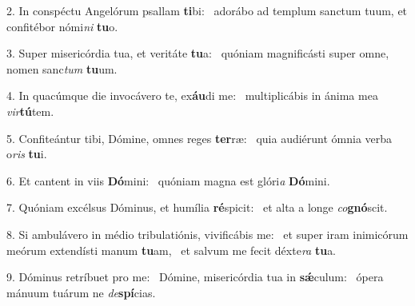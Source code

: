 2. In conspéctu Angelórum psallam \textbf{ti}bi: \ast\  adorábo ad templum sanctum tuum, et confitébor nómi\textit{ni} \textbf{tu}o.\

3. Super misericórdia tua, et veritáte \textbf{tu}a: \ast\  quóniam magnificásti super omne, nomen sanc\textit{tum} \textbf{tu}um.\

4. In quacúmque die invocávero te, ex\textbf{áu}di me: \ast\  multiplicábis in ánima mea \textit{vir}\textbf{tú}tem.\

5. Confiteántur tibi, Dómine, omnes reges \textbf{ter}ræ: \ast\  quia audiérunt ómnia verba o\textit{ris} \textbf{tu}i.\

6. Et cantent in viis \textbf{Dó}mini: \ast\  quóniam magna est glóri\textit{a} \textbf{Dó}mini.\

7. Quóniam excélsus Dóminus, et humília \textbf{ré}spicit: \ast\  et alta a longe \textit{co}\textbf{gnó}scit.\

8. Si ambulávero in médio tribulatiónis, vivificábis me: \dag\  et super iram inimicórum meórum extendísti manum \textbf{tu}am, \ast\  et salvum me fecit déxte\textit{ra} \textbf{tu}a.\

9. Dóminus retríbuet pro me: \dag\  Dómine, misericórdia tua in \textbf{sǽ}culum: \ast\  ópera mánuum tuárum ne \textit{de}\textbf{spí}cias.\

